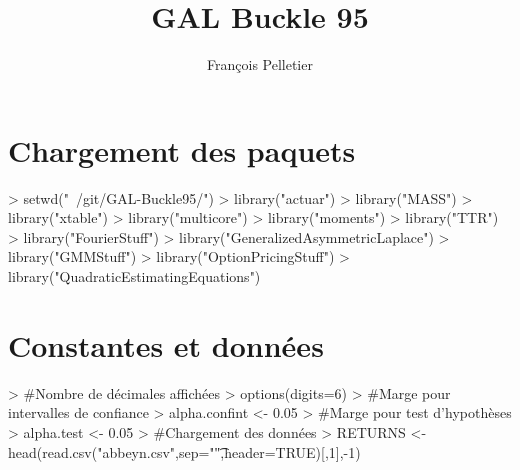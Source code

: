 \documentclass{report}
\begin{document}


\title{GAL Buckle 95}
\author{François Pelletier}
\maketitle
\tableofcontents

\section{Chargement des paquets}
\begin{Schunk}
\begin{Sinput}
> setwd("~/git/GAL-Buckle95/")
> library("actuar")
> library("MASS")
> library("xtable")
> library("multicore")
> library("moments")
> library("TTR")
> library("FourierStuff")
> library("GeneralizedAsymmetricLaplace")
> library("GMMStuff")
> library("OptionPricingStuff")
> library("QuadraticEstimatingEquations")
\end{Sinput}
\end{Schunk}

\section{Constantes et données}

\begin{Schunk}
\begin{Sinput}
> #Nombre de décimales affichées
> options(digits=6)
> #Marge pour intervalles de confiance
> alpha.confint <- 0.05 
> #Marge pour test d'hypothèses
> alpha.test <- 0.05
> #Chargement des données
> RETURNS <- head(read.csv("abbeyn.csv",sep="\t",header=TRUE)[,1],-1)
\end{Sinput}
\end{Schunk}
\end{document}
